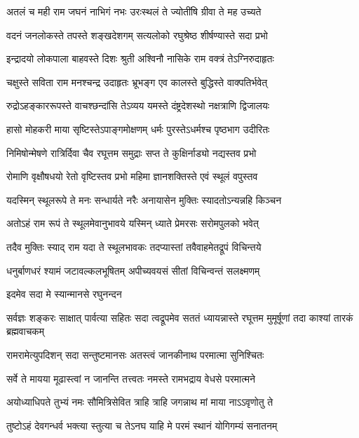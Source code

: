 \twolineshloka
{अतलं च मही राम जघनं नाभिगं नभः}
{उरःस्थलं ते ज्योतींषि ग्रीवा ते मह उच्यते} %

\twolineshloka
{वदनं जनलोकस्ते तपस्ते शङ्खदेशगम्}
{सत्यलोको रघुश्रेष्ठ शीर्षण्यास्ते सदा प्रभो} %

\twolineshloka
{इन्द्रादयो लोकपाला बाहवस्ते दिशः श्रुती}
{अश्विनौ नासिके राम वक्त्रं तेऽग्निरुदाहृतः} %

\twolineshloka
{चक्षुस्ते सविता राम मनश्चन्द्र उदाहृतः}
{भ्रूभङ्ग एव कालस्ते बुद्धिस्ते वाक्पतिर्भवेत्} %

\twolineshloka
{रुद्रोऽहङ्काररूपस्ते वाचश्छन्दांसि तेऽव्यय}
{यमस्ते दंष्ट्रदेशस्थो नक्षत्राणि द्विजालयः} %

\twolineshloka
{हासो मोहकरी माया सृष्टिस्तेऽपाङ्गमोक्षणम्}
{धर्मः पुरस्तेऽधर्मश्च पृष्ठभाग उदीरितः} %

\twolineshloka
{निमिषोन्मेषणे रात्रिर्दिवा चैव रघूत्तम}
{समुद्राः सप्त ते कुक्षिर्नाड्यो नद्यस्तव प्रभो} %

\twolineshloka
{रोमाणि वृक्षौषधयो रेतो वृष्टिस्तव प्रभो}
{महिमा ज्ञानशक्तिस्ते एवं स्थूलं वपुस्तव} %

\twolineshloka
{यदस्मिन् स्थूलरूपे ते मनः सन्धार्यते नरैः}
{अनायासेन मुक्तिः स्यादतोऽन्यन्नहि किञ्चन} %

\twolineshloka
{अतोऽहं राम रूपं ते स्थूलमेवानुभावये}
{यस्मिन् ध्याते प्रेमरसः सरोमपुलको भवेत्} %

\twolineshloka
{तदैव मुक्तिः स्याद् राम यदा ते स्थूलभावकः}
{तदप्यास्तां तवैवाहमेतद्रूपं विचिन्तये} %

\twolineshloka
{धनुर्बाणधरं श्यामं जटावल्कलभूषितम्}
{अपीच्यवयसं सीतां विचिन्वन्तं सलक्ष्मणम्} %

\onelineshloka
{इदमेव सदा मे स्यान्मानसे रघुनन्दन} %


\threelineshloka
{सर्वज्ञः शङ्करः साक्षात् पार्वत्या सहितः सदा}
{त्वद्रूपमेव सततं ध्यायन्नास्ते रघूत्तम}
{मुमूर्षूणां तदा काश्यां तारकं ब्रह्मवाचकम्} %

\twolineshloka
{रामरामेत्युपदिशन् सदा सन्तुष्टमानसः}
{अतस्त्वं जानकीनाथ परमात्मा सुनिश्चितः} %

\twolineshloka
{सर्वे ते मायया मूढास्त्वां न जानन्ति तत्त्वतः}
{नमस्ते रामभद्राय वेधसे परमात्मने} %

\twolineshloka
{अयोध्याधिपते तुभ्यं नमः सौमित्रिसेवित}
{त्राहि त्राहि जगन्नाथ मां माया नाऽऽवृणोतु ते} %


\twolineshloka
{तुष्टोऽहं देवगन्धर्व भक्त्या स्तुत्या च तेऽनघ}
{याहि मे परमं स्थानं योगिगम्यं सनातनम्} %

